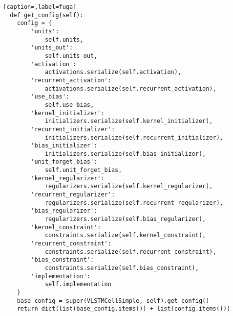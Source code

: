 \begin{lstlisting}[caption=,label=fuga]
  def get_config(self):
    config = {
        'units':
            self.units,
        'units_out':
            self.units_out,
        'activation':
            activations.serialize(self.activation),
        'recurrent_activation':
            activations.serialize(self.recurrent_activation),
        'use_bias':
            self.use_bias,
        'kernel_initializer':
            initializers.serialize(self.kernel_initializer),
        'recurrent_initializer':
            initializers.serialize(self.recurrent_initializer),
        'bias_initializer':
            initializers.serialize(self.bias_initializer),
        'unit_forget_bias':
            self.unit_forget_bias,
        'kernel_regularizer':
            regularizers.serialize(self.kernel_regularizer),
        'recurrent_regularizer':
            regularizers.serialize(self.recurrent_regularizer),
        'bias_regularizer':
            regularizers.serialize(self.bias_regularizer),
        'kernel_constraint':
            constraints.serialize(self.kernel_constraint),
        'recurrent_constraint':
            constraints.serialize(self.recurrent_constraint),
        'bias_constraint':
            constraints.serialize(self.bias_constraint),
        'implementation':
            self.implementation
    }
    base_config = super(VLSTMCellSimple, self).get_config()
    return dict(list(base_config.items()) + list(config.items()))
\end{lstlisting}

